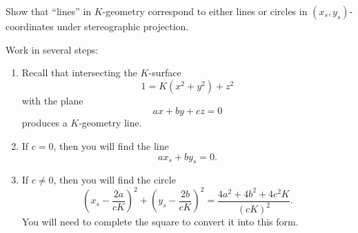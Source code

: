 \documentclass[newpage,hints,12pt,noauthor,nooutcomes]{ximera}
\begin{document}
\begin{problem}
  Show that ``lines'' in $K$-geometry correspond to either lines or circles in
  $(x_{s},y_{s})$-coordinates under stereographic projection.

  \begin{hint}
    Work in several steps:
\begin{enumerate}
\item Recall that intersecting the $K$-surface
  \[
  1 = K\left(x^2+y^2\right) + z^2 
  \]
  with the plane
  \[
  ax+by+cz = 0
  \]
  produces a $K$-geometry line.
\item If $c=0$, then you will find the line
  \[
   ax_s + by_s = 0.
  \]
\item If $c\ne 0$, then you will find the circle
  \[
   \left(x_s - \frac{2a}{cK}\right)^2 + \left(y_s -
   \frac{2b}{cK}\right)^2 = \frac{4a^2 + 4b^2 + 4c^2K}{(cK)^2}.
   \]
   You will need to complete the square to convert it into this form.
\end{enumerate}
\end{hint}


\end{problem}
\end{document}
